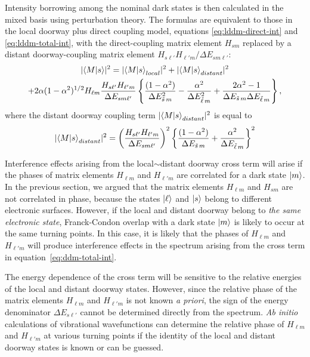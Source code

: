 Intensity borrowing among the nominal dark states is then calculated
in the mixed basis using perturbation theory.  The formulas are
equivalent to those in the local doorway plus direct coupling model,
equations \ref{eq:lddm-direct-int} and \ref{eq:lddm-total-int}, with
the direct-coupling matrix element $H_{s m}$ replaced by a distant
doorway-coupling matrix element $H_{s\ell'} H_{\ell' m} / \Delta E_{s
  m \ell'}$:
\begin{multline}
  \label{eq:ddm-total-int}
    \lvert \mathinner{\langle{M|s}\rangle} \rvert^2 =
    \lvert \mathinner{\langle{M|s}\rangle}_{local} \rvert^2 + 
    \lvert \mathinner{\langle{M|s}\rangle}_{distant} \rvert^2 \\
    + 2 \alpha (1-\alpha^2)^{1/2} H_{\ell m} 
    \frac{H_{s \ell'} H_{\ell' m}}{\Delta E_{s m \ell'}}
    \left \lbrace
      \frac{(1-\alpha^2)}{\Delta E_{\tilde{s}\, m}^2}
      - \frac{\alpha^2}{\Delta E_{\tilde{\ell}\, m}^2}
      + \frac{2\alpha^2 -1}{\Delta E_{\tilde{s}\, m} \Delta E_{\tilde{\ell}\, m}}
    \right \rbrace,
\end{multline}
where the distant doorway coupling term $\lvert \mathinner{\langle{M|s}\rangle}_{distant}
\rvert^2$ is equal to
\begin{equation}
  \label{eq:ddm-distant-int}
  \lvert \mathinner{\langle{M|s}\rangle}_{distant} \rvert^2 = 
  \left (
    \frac{H_{s \ell'} H_{\ell' m}}{\Delta E_{s m \ell'}}
  \right )^2
  \left \lbrace
    \frac{(1 - \alpha^2)}{\Delta E_{\tilde{s}\, m}} +
    \frac{\alpha^2}{\Delta E_{\tilde{\ell}\, m}}
  \right \rbrace^2
\end{equation}

Interference effects arising from the local$\sim$distant doorway cross
term will arise if the phases of matrix elements $H_{\ell m}$ and
$H_{\ell' m}$ are correlated for a dark state $\mathinner{|{m}\rangle}$.  In the
previous section, we argued that the matrix elements $H_{\ell m}$ and
$H_{sm}$ are not correlated in phase, because the states $\mathinner{|{\ell}\rangle}$
and $\mathinner{|{s}\rangle}$ belong to different electronic surfaces.  However, if the
local and distant doorway belong to \emph{the same electronic state},
Franck-Condon overlap with a dark state $\mathinner{|{m}\rangle}$ is likely to occur
at the same turning points. In this case, it is likely that the
phases of $H_{\ell m}$ and $H_{\ell' m}$ will produce interference
effects in the spectrum arising from the cross term in
equation~\ref{eq:ddm-total-int}.  

The energy dependence of the cross term will be sensitive to the
relative energies of the local and distant doorway states.  However,
since the relative phase of the matrix elements $H_{\ell m}$ and
$H_{\ell' m}$ is not known \emph{a priori}, the sign of the energy
denominator $\Delta E_{s \ell'}$ cannot be determined directly from
the spectrum.  \emph{Ab initio} calculations of vibrational
wavefunctions can determine the relative phase of $H_{\ell m}$ and
$H_{\ell' m}$ at various turning points if the identity of the local
and distant doorway states is known or can be guessed.


%  
% 
% 